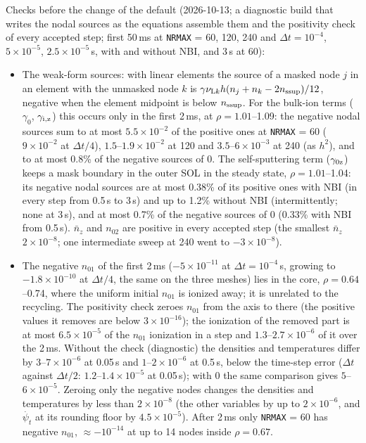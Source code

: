 \documentclass[11pt]{article}
\def\r#1{{\rm#1}}
\def\psit{\psi_t}
\def\psitd{\dot{\psit}}
\def\nsup#1{n_\r{#1sup}}
\def\nnz{\bar{n}_{z}}
\begin{document}
Checks before the change of the default (2026-10-13; a diagnostic build that writes the
nodal sources as the equations assemble them and the positivity check of every accepted
step; first 50\,ms at \texttt{NRMAX} = 60, 120, 240 and $\Delta t = 10^{-4}$, $5\times10^{-5}$,
$2.5\times10^{-5}$\,s, with and without NBI, and 3\,s at 60):
\begin{itemize}
\item The weak-form sources: with linear elements the source of a masked node $j$ in an
  element with the unmasked node $k$ is $\gamma\nu_{\r{L}k}h(n_j+n_k-2\nsup{s})/12$, negative
  when the element midpoint is below $\nsup{s}$.  For the bulk-ion terms ($\gamma_0$,
  $\gamma_\r{i,z}$) this occurs only in the first 2\,ms, at $\rho = 1.01$--1.09: the negative
  nodal sources sum to at most $5.5\times10^{-2}$ of the positive ones at \texttt{NRMAX} = 60
  ($9\times10^{-2}$ at $\Delta t/4$), $1.5$--$1.9\times10^{-2}$ at 120 and
  $3.5$--$6\times10^{-3}$ at 240 (as $h^2$), and to at most 0.8\% of the negative sources of 0.
  The self-sputtering term ($\gamma_\r{0z}$) keeps a mask boundary in the outer SOL in the
  steady state, $\rho = 1.01$--1.04: its negative nodal sources are at most 0.38\% of its positive
  ones with NBI (in every step from 0.5\,s to 3\,s) and up to 1.2\% without NBI (intermittently; none
  at 3\,s), and at most 0.7\% of the negative sources of 0 (0.33\% with NBI from 0.5\,s).  $\nnz$ and $n_{02}$ are
  positive in every accepted step (the smallest $\nnz$ $2\times10^{-8}$; one intermediate sweep at
  240 went to $-3\times10^{-8}$).
\item The negative $n_{01}$ of the first 2\,ms ($-5\times10^{-11}$ at $\Delta t = 10^{-4}$\,s, growing
  to $-1.8\times10^{-10}$ at $\Delta t/4$, the same on the three meshes) lies in the core,
  $\rho = 0.64$--0.74, where the uniform initial $n_{01}$ is ionized away; it is unrelated to the
  recycling.  The positivity check zeroes $n_{01}$ from the axis to there (the positive values it
  removes are below $3\times10^{-16}$); the ionization of the removed part is at most
  $6.5\times10^{-5}$ of the $n_{01}$ ionization in a step and $1.3$--$2.7\times10^{-6}$ of it over
  the 2\,ms.  Without the check (diagnostic) the densities and temperatures differ by
  $3$--$7\times10^{-6}$ at 0.05\,s and $1$--$2\times10^{-6}$ at 0.5\,s, below the time-step error
  ($\Delta t$ against $\Delta t/2$: $1.2$--$1.4\times10^{-5}$ at 0.05\,s); with 0 the same comparison
  gives $5$--$6\times10^{-5}$.  Zeroing only the negative nodes changes the densities and temperatures by less than
  $2\times10^{-8}$ (the other variables by up to $2\times10^{-6}$, and $\psitd$ at its rounding floor
  by $4.5\times10^{-5}$).
  After 2\,ms only \texttt{NRMAX} = 60 has negative $n_{01}$, $\approx-10^{-14}$ at up to 14 nodes
  inside $\rho = 0.67$.
\end{itemize}
\end{document}
